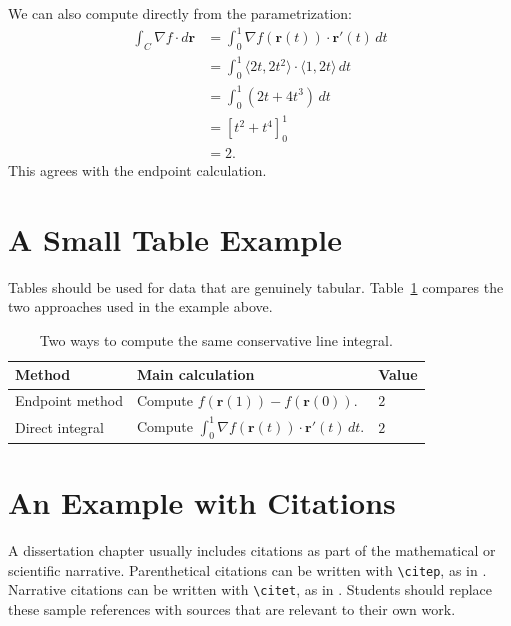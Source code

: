 We can also compute directly from the parametrization:
\[
\begin{aligned}
\int_C \nabla f \cdot d\mathbf r
&= \int_0^1 \nabla f(\mathbf r(t)) \cdot \mathbf r'(t)\,dt \\
&= \int_0^1 \langle 2t,2t^2\rangle \cdot \langle 1,2t\rangle\,dt \\
&= \int_0^1 \left(2t+4t^3\right)\,dt \\
&= \left[t^2+t^4\right]_0^1 \\
&= 2.
\end{aligned}
\]
This agrees with the endpoint calculation.

\section{A Small Table Example}
\label{sec:accessible-table-example}

Tables should be used for data that are genuinely tabular. Table~\ref{tab:ftli-comparison} compares the two approaches used in the example above.

\begin{table}[htbp]
\centering
\caption{Two ways to compute the same conservative line integral.}
\label{tab:ftli-comparison}
\begin{tabular}{p{}p{}p{}}
\toprule
\textbf{Method} & \textbf{Main calculation} & \textbf{Value} \\
\midrule
Endpoint method & Compute \(f(\mathbf r(1))-f(\mathbf r(0))\). & \(2\) \\
Direct integral & Compute \(\int_0^1 \nabla f(\mathbf r(t))\cdot \mathbf r'(t)\,dt\). & \(2\) \\
\bottomrule
\end{tabular}
\end{table}

\section{An Example with Citations}
\label{sec:citations-example}

A dissertation chapter usually includes citations as part of the mathematical or scientific narrative. Parenthetical citations can be written with \verb|\citep|, as in \citep{kiladis2006three}. Narrative citations can be written with \verb|\citet|, as in \citet{tomassini2017interaction}. Students should replace these sample references with sources that are relevant to their own work.


